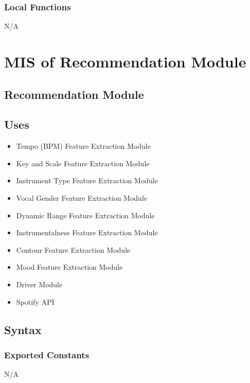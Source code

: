 \documentclass[12pt, titlepage]{article}
\begin{document}
\subsubsection{Local Functions}
N/A

\section{MIS of Recommendation Module} 

\subsection{Recommendation Module}


\subsection{Uses}
\begin{itemize}
  \item Tempo (BPM) Feature Extraction Module
  \item Key and Scale Feature Extraction Module
  \item Instrument Type Feature Extraction Module
  \item Vocal Gender Feature Extraction Module
  \item Dynamic Range Feature Extraction Module
  \item Instrumentalness Feature Extraction Module
  \item Contour Feature Extraction Module
  \item Mood Feature Extraction Module
  \item Driver Module
  \item Spotify API
\end{itemize}

\subsection{Syntax}

\subsubsection{Exported Constants}
N/A
\end{document}
